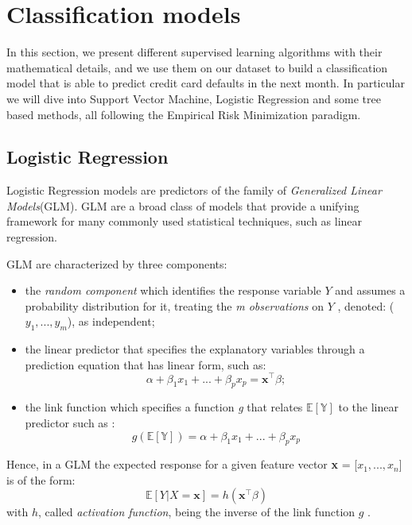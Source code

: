 \documentclass{article}
\begin{document}
\newpage
\section{Classification models}
In this section, we present different supervised learning algorithms with their mathematical details, and we use them on our dataset to build a classification model that is able to predict credit card defaults in the next month. In particular we will dive into Support Vector Machine, Logistic Regression and some tree based methods, all following the Empirical Risk Minimization paradigm.

\subsection{Logistic Regression}
Logistic Regression models are predictors of the family of \emph{Generalized Linear Models}(GLM). GLM are a broad class of models that provide a unifying framework for many commonly used statistical techniques, such as linear regression.

GLM are characterized by three components: 
\begin{itemize}
    \item the \emph{random component} which identifies the response variable $Y$ and assumes a probability distribution for it, treating the \emph{m observations} on $Y$ , denoted: ($y_{1}, ..., y_{m}$), as independent;
    \item the linear predictor that specifies the explanatory variables through a prediction equation that has linear form, such as:
    \begin{equation}
    \alpha + \beta_{1}x_{1}+...+\beta_{p}x_{p} = \textbf{x}^{\top} \beta;
    \end{equation}
    \item the link function which specifies a function \emph{g} that relates $\mathbb{E[Y]}$ to the linear predictor such as \cite{quattordici}:
    \begin{equation}
    g(\mathbb{E[Y]}) = \alpha +  \beta_{1}x_{1}+...+\beta_{p}x_{p}
    \end{equation}
\end{itemize} 
Hence, in a GLM the expected response for a given feature vector \textbf{x} = [$x_{1}, ..., x_{n}$] is of the form:
\begin{equation}
\mathbb{E}[Y|X = \textbf{x}] = h(\textbf{x}^{\top}\beta)
\end{equation}
with $h$, called \emph{activation function}, being the inverse of the link function $g$ \cite{quindici}.
\end{document}

